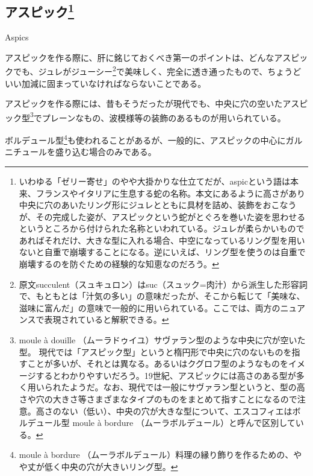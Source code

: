 \begin{main}

\hypertarget{aspics}{%
\subsection[アスピック]{\texorpdfstring{アスピック\footnote{いわゆる「ゼリー寄せ」のやや大掛かりな仕立てだが、aspicという語は本来、フランスやイタリアに生息する蛇の名称。本文にあるように高さがあり中央に穴のあいたリング形にジュレとともに具材を詰め、装飾をおこなうが、その完成した姿が、アスピックという蛇がとぐろを巻いた姿を思わせるというところから付けられた名称といわれている。ジュレが柔らかいものであればそれだけ、大きな型に入れる場合、中空になっているリング型を用いないと自重で崩壊することになる。逆にいえば、リング型を使うのは自重で崩壊するのを防ぐための経験的な知恵なのだろう。}}{アスピック}}\label{aspics}}

\begin{frsecbenv}

Aspics

\end{frsecbenv}


アスピックを作る際に、肝に銘じておくべき第一のポイントは、どんなアスピックでも、ジュレがジューシー\footnote{原文succulent（スュキュロン）はsuc（スュック=肉汁）から派生した形容詞で、もともとは「汁気の多い」の意味だったが、そこから転じて「美味な、滋味に富んだ」の意味で一般的に用いられている。ここでは、両方のニュアンスで表現されていると解釈できる。}で美味しく、完全に透き通ったもので、ちょうどいい加減に固まっていなければならないことである。

アスピックを作る際には、昔もそうだったが現代でも、中央に穴の空いたアスピック型\footnote{moule
  à douille （ムーラドゥイユ）サヴァラン型のような中央に穴が空いた型。
  現代では「アスピック型」というと楕円形で中央に穴のないものを指すことが多いが、それとは異なる。あるいはクグロフ型のようなものをイメージするとわかりやすいだろう。19世紀、アスピックには高さのある型が多く用いられたようだ。なお、現代では一般にサヴァラン型というと、型の高さや穴の大きさ等さまざまなタイプのものをまとめて指すことになるので注意。高さのない（低い）、中央の穴が大きな型について、エスコフィエはボルデュール型
  moule à bordure （ムーラボルデュール）と呼んで区別している。}でプレーンなもの、波模様等の装飾のあるものが用いられている。

ボルデュール型\footnote{moule à bordure
  （ムーラボルデュール）料理の縁り飾りを作るための、やや丈が低く中央の穴が大きいリング型。}も使われることがあるが、一般的に、アスピックの中心にガルニチュールを盛り込む場合のみである。


\end{main}
